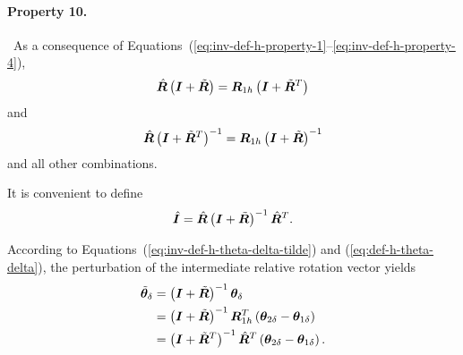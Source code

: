 \documentclass[10pt,fleqn,subeqn]{report}
\newcommand{\T}[1]{\bm{#1}}
\begin{document}
\paragraph{Property 10.} \
As a consequence
of Equations~(\ref{eq:inv-def-h-property-1}--\ref{eq:inv-def-h-property-4}),
\begin{equation}
	\hat{\T{R}} \plbr{\T{I} + \tilde{\T{R}}} 
	= \T{R}_{1h} \plbr{\T{I} + \tilde{\T{R}}^T}
\end{equation}
and
\begin{equation}
	\hat{\T{R}} \plbr{\T{I} + \tilde{\T{R}}^T}^{-1}
	= \T{R}_{1h} \plbr{\T{I} + \tilde{\T{R}}}^{-1}
\end{equation}
and all other combinations.

\bigskip

It is convenient to define
\begin{equation}
	\hat{\T{I}} =
		\hat{\T{R}} \plbr{\T{I} + \tilde{\T{R}}}^{-1} \hat{\T{R}}^T .
\end{equation}

According to Equations~(\ref{eq:inv-def-h-theta-delta-tilde})
and (\ref{eq:def-h-theta-delta}),
the perturbation of the intermediate relative rotation vector yields
\begin{align}
	\tilde{\T{\theta}}_{\delta}
	&= \plbr{\T{I} + \tilde{\T{R}}}^{-1} \T{\theta}_{\delta} \nonumber \\
	&= \plbr{\T{I} + \tilde{\T{R}}}^{-1}
		\T{R}_{1h}^T\plbr{\T{\theta}_{2\delta} - \T{\theta}_{1\delta}} \nonumber \\
	&= \plbr{\T{I} + \tilde{\T{R}}^T}^{-1}
		\hat{\T{R}}^T\plbr{\T{\theta}_{2\delta} - \T{\theta}_{1\delta}} .
\end{align}
\end{document}
